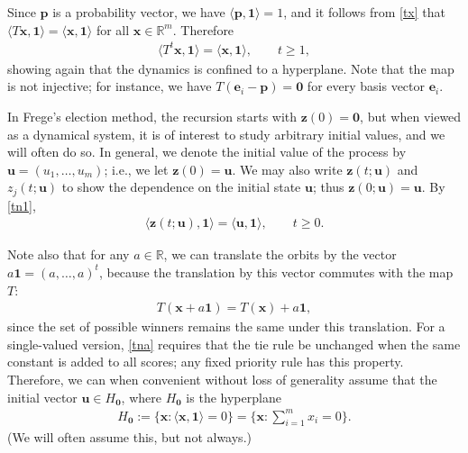 \documentclass[11pt,reqno,tbtags,a4paper]{amsart}
\numberwithin{equation}{section}
\renewcommand\ge{\geq}
\renewcommand\geq{\geqslant}
\theoremstyle{plain}%
\theoremstyle{definition}
\theoremstyle{remark}
\newcommand{\sumim}{\sum_{i=1}^m}
\newcommand\set[1]{\ensuremath{\{#1\}}}
\newcommand\biggset[1]{\ensuremath{\biggl\{#1\biggr\}}}
\newcommand\innprod[1]{\langle#1\rangle}
\newcommand\bbR{\mathbb R}
\newcommand\Ho{H_{\0}}
\newcommand\ve{\mathbf{e}}
\newcommand\vp{\mathbf{p}}
\newcommand\vu{\mathbf{u}}
\newcommand\vx{\mathbf{x}}
\newcommand\vz{\mathbf{z}}
\newcommand\0{{\boldsymbol 0}}
\newcommand\1{{\boldsymbol 1}}
\begin{document}
Since $\vp$ is a probability vector, we have $\langle \vp, \1 \rangle = 1$,
and it follows from \eqref{tx} that
$\langle T\vx, \1 \rangle = \langle \vx, \1 \rangle$ for all $\vx\in\bbR^m$.
Therefore
\begin{align}\label{tn1}
\langle T^t \vx, \1 \rangle = \langle \vx, \1 \rangle, 
\qquad t \ge 1,  
\end{align}
showing again that the dynamics is confined to a hyperplane.
Note that the map is not injective; for instance, 
we have $T(\ve_i-\vp)=\0$ for every basis vector $\ve_i$.

In Frege's election method, the recursion starts with $\vz(0)=\0$, but when
viewed as a dynamical system, it is of interest to study arbitrary initial
values, and we will often do so.
In general, we 
denote the initial value of the process by
$\vu = (u_1, \dots, u_m)$; i.e., we
let $\vz(0) = \vu$.
We may also write $\vz(t;\vu)$ and $z_j(t;\vu)$ to show the dependence on 
the initial state $\vu$; thus $\vz(0;\vu)=\vu$. By \eqref{tn1},
\begin{align}\label{tn2}
\langle \vz(t;\vu),\1 \rangle = \langle \vu, \1 \rangle, 
\qquad t \ge 0. 
\end{align}

Note also that for any $a\in\bbR$, 
we can translate the orbits by 
the vector $a\1=(a,\dots,a)^t$, 
because the translation by this vector commutes with the map $T$:
\begin{align}\label{tna}
  T(\vx+a\1) = T(\vx)+a\1,
\end{align}
since the set of possible winners remains the same under this translation.
For a single-valued version, \eqref{tna} requires that the tie rule be
unchanged when the same constant is added to all scores; any fixed priority
rule has this property.
Therefore, we can when convenient 
without loss of generality assume that the initial vector
$\vu\in\Ho$, where 
$\Ho$ is the hyperplane
\begin{align}\label{Ho}
\Ho:=\set{\vx:\innprod{\vx,\1}=0}  
=\biggset{\vx:\sumim x_i=0}.
\end{align}
%
(We will often assume this, but not always.)
\end{document}
